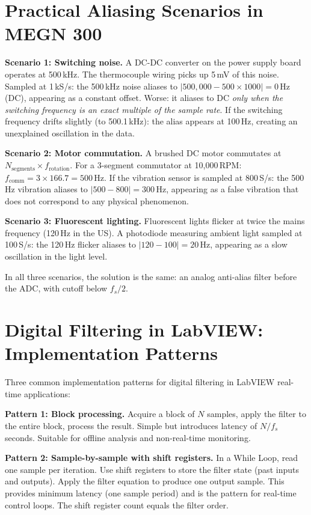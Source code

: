\documentclass[11pt,letterpaper,twoside,openany]{book}
\begin{document}
\section{Practical Aliasing Scenarios in MEGN 300}
\textbf{Scenario 1: Switching noise.} A DC-DC converter on the power supply board operates at 500\,kHz. The thermocouple wiring picks up 5\,mV of this noise. Sampled at 1\,kS/s: the 500\,kHz noise aliases to $|500{,}000 - 500 \times 1000| = 0$\,Hz (DC), appearing as a constant offset. Worse: it aliases to DC \emph{only when the switching frequency is an exact multiple of the sample rate}. If the switching frequency drifts slightly (to 500.1\,kHz): the alias appears at 100\,Hz, creating an unexplained oscillation in the data.

\textbf{Scenario 2: Motor commutation.} A brushed DC motor commutates at $N_{\text{segments}} \times f_{\text{rotation}}$. For a 3-segment commutator at 10{,}000\,RPM: $f_{\text{comm}} = 3 \times 166.7 = 500$\,Hz. If the vibration sensor is sampled at 800\,S/s: the 500\,Hz vibration aliases to $|500 - 800| = 300$\,Hz, appearing as a false vibration that does not correspond to any physical phenomenon.

\textbf{Scenario 3: Fluorescent lighting.} Fluorescent lights flicker at twice the mains frequency (120\,Hz in the US). A photodiode measuring ambient light sampled at 100\,S/s: the 120\,Hz flicker aliases to $|120 - 100| = 20$\,Hz, appearing as a slow oscillation in the light level.

In all three scenarios, the solution is the same: an analog anti-alias filter before the ADC, with cutoff below $f_s/2$.
\section{Digital Filtering in LabVIEW: Implementation Patterns}
Three common implementation patterns for digital filtering in LabVIEW real-time applications:

\textbf{Pattern 1: Block processing.} Acquire a block of $N$ samples, apply the filter to the entire block, process the result. Simple but introduces latency of $N/f_s$ seconds. Suitable for offline analysis and non-real-time monitoring.

\textbf{Pattern 2: Sample-by-sample with shift registers.} In a While Loop, read one sample per iteration. Use shift registers to store the filter state (past inputs and outputs). Apply the filter equation to produce one output sample. This provides minimum latency (one sample period) and is the pattern for real-time control loops. The shift register count equals the filter order.
\end{document}
